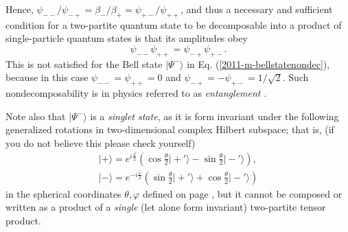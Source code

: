 {Hence,
$\psi_{--}/ \psi_{-+} =   \beta_- / \beta_+ =   \psi_{+-} / \psi_{++}$,
and thus a necessary and sufficient condition for a two-partite quantum state to be decomposable
into a product of single-particle quantum states is that its amplitudes obey
 \begin{equation}
\psi_{--}\psi_{++}  =  \psi_{-+}   \psi_{+-} .
\end{equation}
This is not satisfied for the Bell state $\vert \Psi^-\rangle$ in Eq. (\ref{2011-m-bellstatenondec}),
because in this case $\psi_{--}=\psi_{++} =0$
and  $ \psi_{-+} = - \psi_{+-} =1/\sqrt{2}$.
Such nondecomposability is in physics referred to as {\em entanglement}
\cite{CambridgeJournals:1737068,CambridgeJournals:2027212,schrodinger}.

Note also that $\vert \Psi^-\rangle$ is a {\em singlet state},
as it is form invariant under the following generalized rotations in two-dimensional complex Hilbert subspace; that is,
(if you do not believe this please check yourself)
\begin{equation}
\begin{split}
\vert + \rangle =
e^{ i{\frac{\varphi}{2}} }
\left(
\cos \frac{\theta}{2} \vert +'  \rangle
-
\sin \frac{\theta}{2} \vert -'   \rangle
\right),
\\
 \vert - \rangle =
e^{ -i{\frac{\varphi}{2}} }
\left(
\sin \frac{\theta}{2} \vert +'   \rangle
+
\cos \frac{\theta}{2} \vert -'  \rangle
\right)
\end{split}
\end{equation}
in the spherical coordinates $\theta , \varphi$ defined on page \pageref{2011-m-spericalcoo},
but it cannot be composed or written as a product of a {\em single} (let alone form invariant) two-partite tensor product.

\eexample
}


%
%

